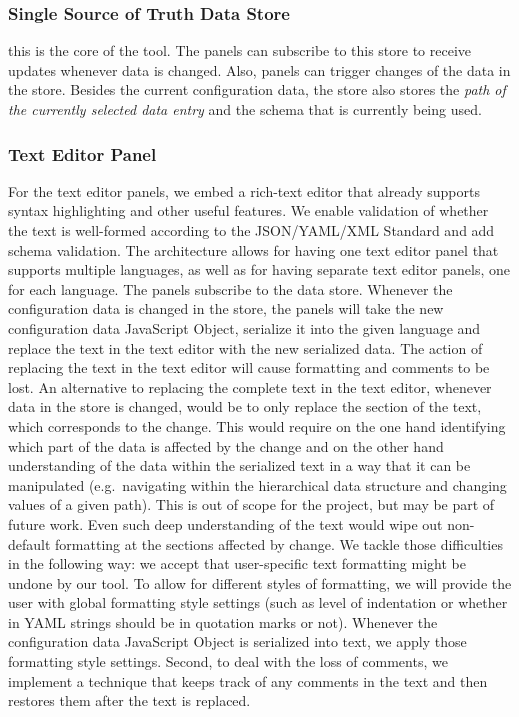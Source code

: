 \subsubsection{Single Source of Truth Data Store}
this is the core of the tool.
The panels can subscribe to this store to receive updates whenever data is changed.
Also, panels can trigger changes of the data in the store.
Besides the current configuration data, the store also stores the \textit{path of the currently selected data entry} and the schema that is currently being used.


\subsubsection{Text Editor Panel} %
For the text editor panels, we embed a rich-text editor that already supports syntax highlighting and other useful features.
We enable validation of whether the text is well-formed according to the JSON/YAML/XML Standard and add schema validation.
The architecture allows for having one text editor panel that supports multiple languages, as well as for having separate text editor panels, one for each language.
The panels subscribe to the data store.
Whenever the configuration data is changed in the store, the panels will take the new configuration data JavaScript Object, serialize it into the given language and replace the text in the text editor with the new serialized data.
The action of replacing the text in the text editor will cause formatting and comments to be lost.
An alternative to replacing the complete text in the text editor, whenever data in the store is changed, would be to only replace the section of the text, which corresponds to the change.
This would require on the one hand identifying which part of the data is affected by the change and on the other hand understanding of the data within the serialized text in a way that it can be manipulated (e.g.\ navigating within the hierarchical data structure and changing values of a given path). 
This is out of scope for the project, but may be part of future work.
Even such deep understanding of the text would wipe out non-default formatting at the sections affected by change.
We tackle those difficulties in the following way: we accept that user-specific text formatting might be undone by our tool.
To allow for different styles of formatting, we will provide the user with global formatting style settings (such as level of indentation or whether in YAML strings should be in quotation marks or not). %
Whenever the configuration data JavaScript Object is serialized into text, we apply those formatting style settings.
Second, to deal with the loss of comments, we implement a technique that keeps track of any comments in the text and then restores them after the text is replaced. %

